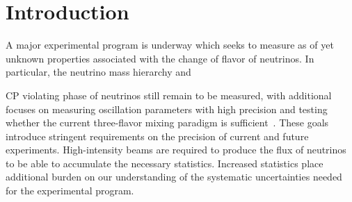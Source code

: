 \documentclass{ar-1col}
\begin{document}
\maketitle

\tableofcontents


\section{Introduction\label{sec:intro}}

A major experimental program is underway which seeks to measure
as of yet unknown properties associated with the change of flavor of neutrinos.
In particular, the neutrino mass hierarchy and%
\begin{marginnote}
\end{marginnote}%
CP violating phase
of neutrinos still remain to be measured, with additional focuses on measuring
oscillation parameters with high precision and testing whether the current
three-flavor mixing paradigm is sufficient~\cite{Esteban:2020cvm, ParticleDataGroup:2020ssz}.
These goals introduce stringent requirements on the precision of current and future experiments.
High-intensity beams are required to produce the flux of neutrinos to be able to accumulate the necessary statistics.
Increased statistics place additional burden on our understanding of the systematic uncertainties needed for the experimental program.
\end{document}
